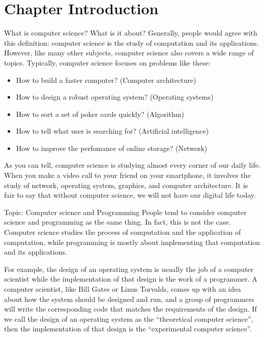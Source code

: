 \documentclass[../main.tex]{subfiles}
\begin{document}
    \section{Chapter Introduction}

What is computer science? What is it about? Generally, people would agree with
this definition: computer science is the study of computation and its
applications. However, like many other subjects, computer science also covers a
wide range of topics. Typically, computer science focuses on problems like these:

\begin{itemize}
    \item How to build a faster computer? (Computer architecture)
    \item How to design a robust operating system? (Operating systems)
    \item How to sort a set of poker cards quickly? (Algorithm)
    \item How to tell what user is searching for? (Artificial intelligence)
    \item How to improve the perfomance of online storage? (Network)
\end{itemize}

As you can tell, computer science is studying almost every corner of our daily
life. When you make a video call to your friend on your smartphone, it involves
the study of network, operating system, graphics, and computer architecture. It
is fair to say that without computer science, we will not have our digital life
today.

Topic: Computer science and Programming
People tend to consider computer science and programming as the same thing. In
fact, this is not the case. Computer science studies the process of computation
and the application of computation, while programming is mostly about
implementing that computation and its applications.

For example, the design of an operating system is usually the job of a computer
scientist while the implementation of that design is the work of a programmer.
A computer scientist, like Bill Gates or Linus Torvalds, comes up with an idea
about how the system should be designed and run, and a group of programmers will
write the corresponding code that matches the requirements of the design. If we
call the design of an operating system as the ``theoretical computer science'',
then the implementation of that design is the ``experimental computer science''.
\end{document}

